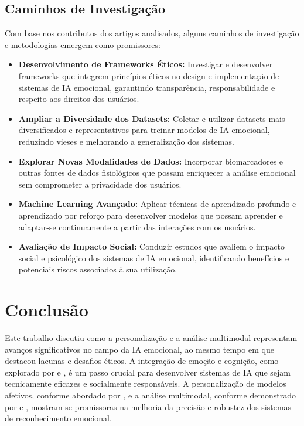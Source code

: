 \documentclass[a4paper,12pt]{report}
\begin{document}
	\subsection{Caminhos de Investigação}
	
	Com base nos contributos dos artigos analisados, alguns caminhos de investigação e metodologias emergem como promissores:
	
	\begin{itemize}
		\item \textbf{Desenvolvimento de Frameworks Éticos:} Investigar e desenvolver frameworks que integrem princípios éticos no design e implementação de sistemas de IA emocional, garantindo transparência, responsabilidade e respeito aos direitos dos usuários.
		\item \textbf{Ampliar a Diversidade dos Datasets:} Coletar e utilizar datasets mais diversificados e representativos para treinar modelos de IA emocional, reduzindo vieses e melhorando a generalização dos sistemas.
		\item \textbf{Explorar Novas Modalidades de Dados:} Incorporar biomarcadores e outras fontes de dados fisiológicos que possam enriquecer a análise emocional sem comprometer a privacidade dos usuários.
		\item \textbf{Machine Learning Avançado:} Aplicar técnicas de aprendizado profundo e aprendizado por reforço para desenvolver modelos que possam aprender e adaptar-se continuamente a partir das interações com os usuários.
		\item \textbf{Avaliação de Impacto Social:} Conduzir estudos que avaliem o impacto social e psicológico dos sistemas de IA emocional, identificando benefícios e potenciais riscos associados à sua utilização.
	\end{itemize}
	
	
	\section{Conclusão}
	
	Este trabalho discutiu como a personalização e a análise multimodal representam avanços significativos no campo da IA emocional, ao mesmo tempo em que destacou lacunas e desafios éticos. A integração de emoção e cognição, como explorado por \textcite{pessoa2013} e \textcite{haidt2001}, é um passo crucial para desenvolver sistemas de IA que sejam tecnicamente eficazes e socialmente responsáveis. A personalização de modelos afetivos, conforme abordado por \textcite{kargarandehkordi2024}, e a análise multimodal, conforme demonstrado por \textcite{gursesli2024} e \textcite{lee2024}, mostram-se promissoras na melhoria da precisão e robustez dos sistemas de reconhecimento emocional.
	
\end{document}
